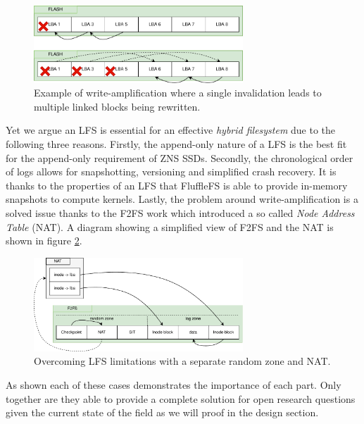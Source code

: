 \begin{figure}
    \centering
	\includegraphics[width=0.7\textwidth]{resources/images/write-amplification.pdf}
	\caption{Example of write-amplification where a single invalidation leads
    to multiple linked blocks being rewritten.}
    \label{figure:writeamplification}
\end{figure}

Yet we argue an LFS is essential for an effective \textit{hybrid filesystem} due
to the following three reasons. Firstly, the append-only nature of a LFS is the
best fit for the append-only requirement of ZNS SSDs. Secondly, the
chronological order of logs allows for snapshotting, versioning and simplified
crash recovery. It is thanks to the properties of an LFS that FluffleFS is able
to provide in-memory snapshots to compute kernels. Lastly, the problem around
write-amplification is a solved issue thanks to the F2FS \cite{Lee2015F2FSAN}
work which introduced a so called \textit{Node Address Table} (NAT). A diagram
showing a simplified view of F2FS and the NAT is shown in figure
\ref{figure:f2fsnat}.

\begin{figure}
    \centering
	\includegraphics[width=0.7\textwidth]{resources/images/f2fs-nat.pdf}
	\caption{Overcoming LFS limitations with a separate random zone and NAT.}
    \label{figure:f2fsnat}
\end{figure}

As shown each of these cases demonstrates the importance of each part. Only
together are they able to provide a complete solution for open research
questions given the current state of the field as we will proof in the design
section.

